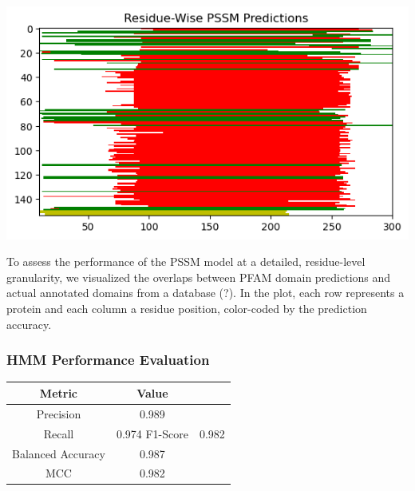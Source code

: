 \documentclass[10pt,twocolumn,letterpaper]{article}
\begin{document}
\begin{center}
    \includegraphics[scale=0.4]{img/pssm_residue_level_eval.png}
\end{center}

To assess the performance of the PSSM model at a detailed, residue-level granularity,
we visualized the overlaps between PFAM domain predictions and actual annotated domains from a database (?). In the plot, each row represents a protein and each column a residue position, color-coded by the prediction accuracy. 

\subsubsection{HMM Performance Evaluation}

\begin{center}
    \begin{tabular}{ccc}
        \toprule
        Metric & Value \\
        \midrule
        Precision & 0.989 \\
        Recall & 0.974
        F1-Score & 0.982 \\
        Balanced Accuracy & 0.987 \\
        MCC & 0.982 \\
        \bottomrule
    \end{tabular}
\end{center} 
\end{document}
